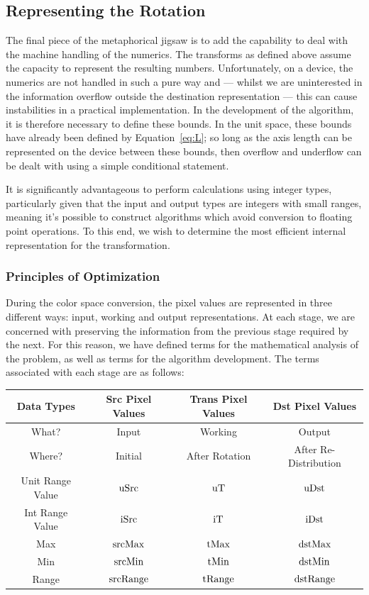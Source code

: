 \subsection{Representing the Rotation}

The final piece of the metaphorical jigsaw is to add the capability to deal with the machine handling of the numerics. The transforms as defined above assume the capacity to represent the resulting numbers. Unfortunately, on a device, the numerics are not handled in such a pure way and --- whilst we are uninterested in the information overflow outside the destination representation --- this can cause instabilities in a practical implementation. In the development of the algorithm, it is therefore necessary to define these bounds. In the unit space, these bounds have already been defined by Equation~\ref{eq:L}; so long as the axis length can be represented on the device between these bounds, then overflow and underflow can be dealt with using a simple conditional statement.

It is significantly advantageous to perform calculations using integer types, particularly given that the input and output types are integers with small ranges, meaning it's possible to construct algorithms which avoid conversion to floating point operations. To this end, we wish to determine the most efficient internal representation for the transformation.

\subsubsection{Principles of Optimization}

During the color space conversion, the pixel values are represented in three different ways: input, working and output representations. At each stage, we are concerned with preserving the information from the previous stage required by the next. For this reason, we have defined terms for the mathematical analysis of the problem, as well as terms for the algorithm development. The terms associated with each stage are as follows:

\begin{tabular}{|c|c|c|c|}
  \hline
     Data Types & Src Pixel Values & Trans Pixel Values & Dst Pixel Values \\ \hline
  What? & Input & Working & Output \\ \hline
  Where? & Initial & After Rotation & After Re-Distribution \\ \hline
  Unit Range Value & $ \text{uSrc} $ & $\text{uT}$ & $\text{uDst}$ \\ \cline{1-1}
  Int Range Value & $\text{iSrc}$ & $\text{iT}$ & $\text{iDst}$ \\ \cline{1-1}
  Max & $\text{srcMax}$ & $\text{tMax}$ & $\text{dstMax}$ \\ \cline{1-1}
  Min & $\text{srcMin}$ & $\text{tMin}$ & $\text{dstMin}$ \\ \cline{1-1}
  Range & $\text{srcRange}$ & $\text{tRange}$ & $\text{dstRange}$ \\
  \hline
\end{tabular}

